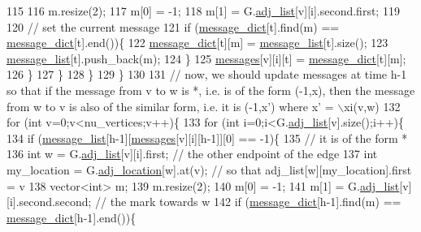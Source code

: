 \begin{DoxyCode}
115           
116           m.resize(2);
117           m[0] = -1;
118           m[1] = G.\hyperlink{classmarked__graph_a1a0bf7ca413a278763f7c878b3b6fd6f}{adj\_list}[v][i].second.first;
119 
120           \textcolor{comment}{// set the current message}
121           \textcolor{keywordflow}{if} (\hyperlink{classgraph__message_ad0a6d35ac8550fb7ff03ce90fce7d5a5}{message\_dict}[t].find(m) == \hyperlink{classgraph__message_ad0a6d35ac8550fb7ff03ce90fce7d5a5}{message\_dict}[t].end())\{
122             \hyperlink{classgraph__message_ad0a6d35ac8550fb7ff03ce90fce7d5a5}{message\_dict}[t][m] = \hyperlink{classgraph__message_aa17fdb629b423343edfafa97252763ef}{message\_list}[t].size();
123             \hyperlink{classgraph__message_aa17fdb629b423343edfafa97252763ef}{message\_list}[t].push\_back(m);
124           \}
125           \hyperlink{classgraph__message_aac77e098f0acf9650116a8e51fe3b4b7}{messages}[v][i][t] = \hyperlink{classgraph__message_ad0a6d35ac8550fb7ff03ce90fce7d5a5}{message\_dict}[t][m];
126         \}
127       \}
128     \}
129   \}
130 
131   \textcolor{comment}{// now, we should update messages at time h-1 so that if the message from v to w is *, i.e. is of the
       form (-1,x), then the message from w to v is also of the similar form, i.e. it is (-1,x') where x' = \(\backslash\)xi(v,w)}
132   \textcolor{keywordflow}{for} (\textcolor{keywordtype}{int} v=0;v<nu\_vertices;v++)\{
133     \textcolor{keywordflow}{for} (\textcolor{keywordtype}{int} i=0;i<G.\hyperlink{classmarked__graph_a1a0bf7ca413a278763f7c878b3b6fd6f}{adj\_list}[v].size();i++)\{
134       \textcolor{keywordflow}{if} (\hyperlink{classgraph__message_aa17fdb629b423343edfafa97252763ef}{message\_list}[h-1][\hyperlink{classgraph__message_aac77e098f0acf9650116a8e51fe3b4b7}{messages}[v][i][h-1]][0] == -1)\{
135         \textcolor{comment}{// it is of the form *}
136         \textcolor{keywordtype}{int} w = G.\hyperlink{classmarked__graph_a1a0bf7ca413a278763f7c878b3b6fd6f}{adj\_list}[v][i].first; \textcolor{comment}{// the other endpoint of the edge}
137         \textcolor{keywordtype}{int} my\_location = G.\hyperlink{classmarked__graph_a3ae722ea9583ad23af34d789a88ac01a}{adj\_location}[w].at(v); \textcolor{comment}{// so that adj\_list[w][my\_location].first =
       v}
138         vector<int> m;
139         m.resize(2);
140         m[0] = -1;
141         m[1] = G.\hyperlink{classmarked__graph_a1a0bf7ca413a278763f7c878b3b6fd6f}{adj\_list}[v][i].second.second; \textcolor{comment}{// the mark towards w}
142         \textcolor{keywordflow}{if} (\hyperlink{classgraph__message_ad0a6d35ac8550fb7ff03ce90fce7d5a5}{message\_dict}[h-1].find(m) == \hyperlink{classgraph__message_ad0a6d35ac8550fb7ff03ce90fce7d5a5}{message\_dict}[h-1].end())\{

\end{DoxyCode}
